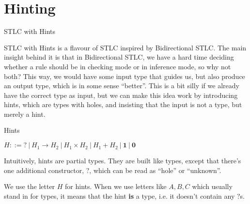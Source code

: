 \documentclass{beamer}
\newcommand{\pipe}{\ |\ }
\newcommand{\Fun}[2]{#1 \to #2}
\newcommand{\Prod}[2]{#1 \times #2}
\newcommand{\Sum}[2]{#1 + #2}
\newcommand{\Unit}{\textbf{1}}
\newcommand{\Empty}{\textbf{0}}
\begin{document}
\section{Hinting}

\newcommand{\fullhinting}[4]{#1 \vdash #2 \mathcolor{blue}{\Leftarrow} #3 \mathcolor{red}{\Rightarrow} #4}
\newcommand{\hinting}[3]{\fullhinting{\Gamma}{#1}{#2}{#3}}

\newcommand{\Hole}{\textbf{?}}
\newcommand{\combinehints}[2]{#1 \sqcup #2}
\newcommand{\hintorder}[2]{#1 \sqsubseteq #2}
\newcommand{\hintfor}[1]{\texttt{hint}(#1)}

\begin{frame}{STLC with Hints}

STLC with Hints is a flavour of STLC inspired by Bidirectional STLC. The main insight behind it is that in Bidirectional STLC, we have a hard time deciding whether a rule should be in checking mode or in inference mode, so why not both? This way, we would have some input type that guides us, but also produce an output type, which is in some sense ``better''. This is a bit silly if we already have the correct type as input, but we can make this idea work by introducing hints, which are types with holes, and insisting that the input is not a type, but merely a hint.

\end{frame}

\begin{frame}{Hints}

$H ::= \Hole \pipe \Fun{H_1}{H_2} \pipe \Prod{H_1}{H_2} \pipe \Sum{H_1}{H_2} \pipe \Unit \pipe \Empty$

\vspace{2em}

Intuitively, hints are partial types. They are built like types, except that there's one additional constructor, $\Hole$, which can be read as ``hole'' or ``unknown''.

\vspace{2em}

We use the letter $H$ for hints. When we use letters like $A, B, C$ which usually stand in for types, it means that the hint \textbf{is} a type, i.e. it doesn't contain any $\Hole$s.

\end{frame}
\end{document}
